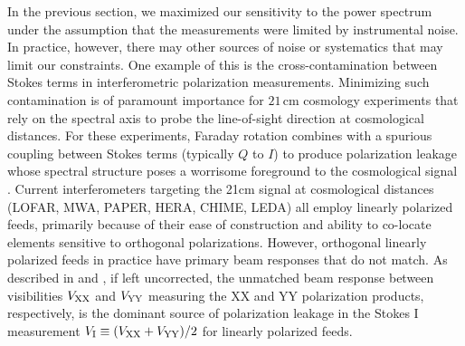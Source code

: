 \documentclass[twocolumn,apj,numberedappendix]{emulateapj}
\begin{document}
In the previous section, we maximized our sensitivity to the power spectrum under the assumption that the measurements were limited by instrumental noise. In practice, however, there may other sources of noise or systematics that may limit our constraints. One example of this is the cross-contamination between Stokes terms in interferometric polarization measurements. Minimizing such contamination is of paramount importance for $21\,\textrm{cm}$ cosmology experiments that rely on
the spectral axis to probe the line-of-sight direction at cosmological distances.  For these
experiments, Faraday rotation combines
with a spurious coupling between Stokes terms (typically $Q$ to $I$) to produce polarization leakage whose 
spectral structure poses a worrisome foreground
to the cosmological signal \citep{jelic_et_al2008,jelic_et_al2010,jelic_et_al2014,bernardi_et_al2013,moore_et_al2013,moore_et_al2015}.  Current interferometers
targeting the 21cm signal at cosmological distances (LOFAR, MWA, PAPER, HERA, CHIME, LEDA) all employ linearly
polarized feeds, primarily because of their ease of construction and ability to co-locate elements sensitive to
orthogonal polarizations.  However, orthogonal linearly polarized feeds in practice have primary beam responses
that do not match.  As described in \citet{moore_et_al2013} and \citet{jelic_et_al2010}, if left uncorrected, the unmatched beam response 
between visibilities ${V_{\rm XX}}$ and ${V_{\rm YY}}$ measuring the XX and YY polarization products, respectively, is the 
dominant source of polarization leakage in the Stokes I measurement ${V_{\rm I}}\equiv({V_{\rm XX}}+{V_{\rm YY}})/2$ for
linearly polarized feeds.
\end{document}

